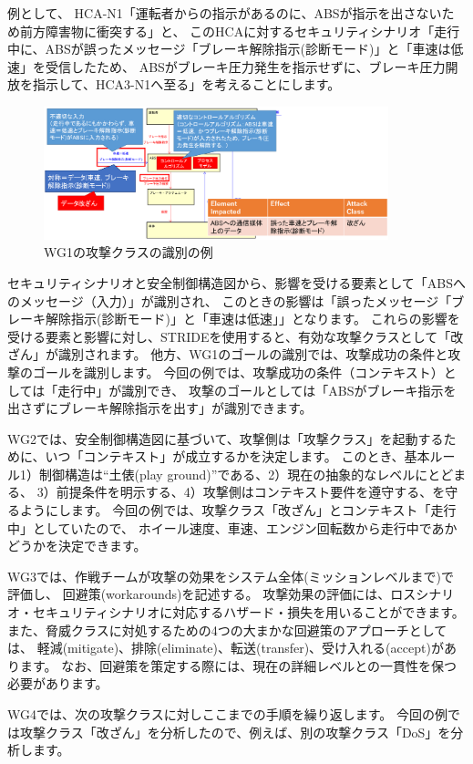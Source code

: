 例として、
HCA-N1「運転者からの指示があるのに、ABSが指示を出さないため前方障害物に衝突する」と、
このHCAに対するセキュリティシナリオ「走行中に、ABSが誤ったメッセージ「ブレーキ解除指示(診断モード)」と「車速は低速」を受信したため、
ABSがブレーキ圧力発生を指示せずに、ブレーキ圧力開放を指示して、HCA3-N1へ至る」を考えることにします。
%
\begin{figure}[H]
    \centering
    \includegraphics[width=100mm]{safety_assurance_contents/ch3images/fig-3-3-1-05.png}
    \caption{WG1の攻撃クラスの識別の例}
\end{figure}
%
セキュリティシナリオと安全制御構造図から、影響を受ける要素として「ABSへのメッセージ（入力）」が識別され、
このときの影響は「誤ったメッセージ「ブレーキ解除指示(診断モード)」と「車速は低速」」となります。
これらの影響を受ける要素と影響に対し、STRIDEを使用すると、有効な攻撃クラスとして「改ざん」が識別されます。
他方、WG1のゴールの識別では、攻撃成功の条件と攻撃のゴールを識別します。
今回の例では、攻撃成功の条件（コンテキスト）としては「走行中」が識別でき、
攻撃のゴールとしては「ABSがブレーキ指示を出さずにブレーキ解除指示を出す」が識別できます。

WG2では、安全制御構造図に基づいて、攻撃側は「攻撃クラス」を起動するために、いつ「コンテキスト」が成立するかを決定します。
このとき、基本ルール1）制御構造は“土俵(play ground)”である、2）現在の抽象的なレベルにとどまる、
3）前提条件を明示する、4）攻撃側はコンテキスト要件を遵守する、を守るようにします。
今回の例では、攻撃クラス「改ざん」とコンテキスト「走行中」としていたので、
ホイール速度、車速、エンジン回転数から走行中であかどうかを決定できます。

WG3では、作戦チームが攻撃の効果をシステム全体(ミッションレベルまで)で評価し、
回避策(workarounds)を記述する。
攻撃効果の評価には、ロスシナリオ・セキュリティシナリオに対応するハザード・損失を用いることができます。
また、脅威クラスに対処するための4つの大まかな回避策のアプローチとしては、
軽減(mitigate)、排除(eliminate)、転送(transfer)、受け入れる(accept)があります。
なお、回避策を策定する際には、現在の詳細レベルとの一貫性を保つ必要があります。

WG4では、次の攻撃クラスに対しここまでの手順を繰り返します。
今回の例では攻撃クラス「改ざん」を分析したので、例えば、別の攻撃クラス「DoS」を分析します。



